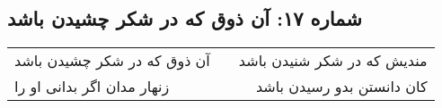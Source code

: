 \begin{center}
\section*{شماره ۱۷: آن ذوق که در شکر چشیدن باشد}
\label{sec:017}
\begin{longtable}{l p{0.5cm} r}
آن ذوق که در شکر چشیدن باشد
&&
مندیش که در شکر شنیدن باشد
\\
زنهار مدان اگر بدانی او را
&&
کان دانستن بدو رسیدن باشد
\\
\end{longtable}
\end{center}
